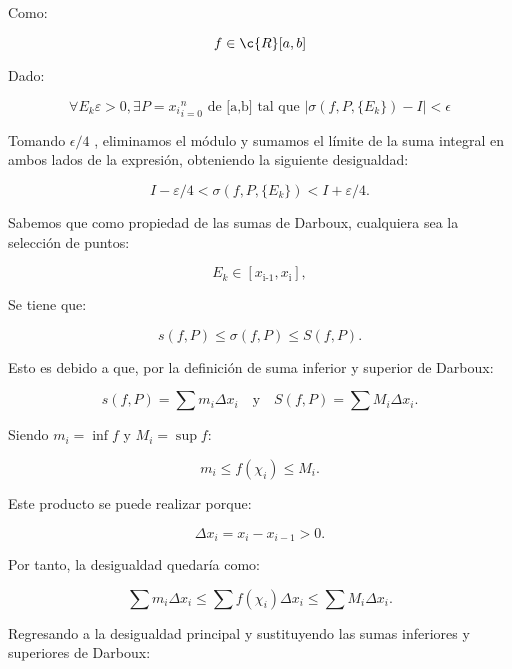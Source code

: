 \documentclass[a4paper,12pt]{article}
\begin{document}
	Como:
	
	\[
	f \in \c{R}[a,b] 
	\]
	
	Dado:
	
	\[
	\forall {E_k}      
	\varepsilon > 0, \exists P = {{x_i}}^n _{i=0} \text{ de [a,b] tal que  } \left| \sigma(f, P, \{E_k\}) - I \right| < \epsilon 
	\]
	
	Tomando $\epsilon/4$ , eliminamos el módulo y sumamos el límite de la suma integral en ambos lados de la expresión, obteniendo la siguiente desigualdad:
	
	
	
	\[
	I - \varepsilon/4 < \sigma(f, P, \{E_k\}) < I + \varepsilon/4.
	\]
	
	
	
	Sabemos que como propiedad de las sumas de Darboux, cualquiera sea la selección de puntos:
	
	
	
	\[
	E_k \in [x_{\text{i-1}},x_{\text{i}}],
	\]
	
	
	
	Se tiene que:
	
	
	
	\[
	s(f, P) \leq \sigma(f, P) \leq S(f, P).
	\]
	
	
	
	Esto es debido a que, por la definición de suma inferior y superior de Darboux:
	
	
	
	\[
	s(f, P) = \sum m_i \Delta x_i \quad \text{y} \quad S(f, P) = \sum M_i \Delta x_i.
	\]
	
	
	
	Siendo \( m_i = \inf f \) y \( M_i = \sup f \):
	
	
	
	\[
	m_i \leq f(\chi_i) \leq M_i.
	\]
	
	
	
	Este producto se puede realizar porque:
	
	
	
	\[
	\Delta x_i = x_i - x_{i-1} > 0.
	\]
	
	
	
	Por tanto, la desigualdad quedaría como:
	
	
	
	\[
	\sum m_i \Delta x_i \leq \sum f(\chi_i) \Delta x_i \leq \sum M_i \Delta x_i.
	\]
	
	
	
	Regresando a la desigualdad principal y sustituyendo las sumas inferiores y superiores de Darboux:
	
\end{document}
